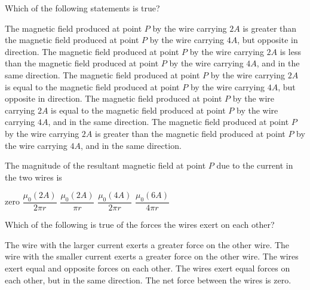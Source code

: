 \documentclass{../../../oss-classkick-exam}
\begin{document}
\begin{multicols*}{2}
\begin{questions}
    \question Which of the following statements is true?
    \begin{choices}
      \choice The magnetic field produced at point $P$ by the wire carrying
      $2A$ is greater than the magnetic field produced at point $P$ by the wire
      carrying $4A$, but opposite in direction.
      \choice The magnetic field produced at point $P$ by the wire carrying
      $2A$ is less than the magnetic field produced at point $P$ by the wire
      carrying $4A$, and in the same direction.
      \choice The magnetic field produced at point $P$ by the wire carrying
      $2A$ is equal to the magnetic field produced at point $P$ by the wire
      carrying $4A$, but opposite in direction.
      \choice The magnetic field produced at point $P$ by the wire carrying
      $2A$ is equal to the magnetic field produced at point $P$ by the wire
      carrying $4A$, and in the same direction.
      \choice The magnetic field produced at point $P$ by the wire carrying
      $2A$ is greater than the magnetic field produced at point $P$ by the wire
      carrying $4A$, and in the same direction.
    \end{choices}
    \label{q:2wires1}
    \vspace{.7in}
    
    \question The magnitude of the resultant magnetic field at point $P$ due to
    the current in the two wires is
    \begin{choices}
      \choice zero
      \choice $\dfrac{\mu_0(2A)}{2\pi r}$
      \choice $\dfrac{\mu_0(2A)}{\pi r}$
      \choice $\dfrac{\mu_0(4A)}{2\pi r}$
      \choice $\dfrac{\mu_0(6A)}{4\pi r}$
    \end{choices}
    \label{q:2wires2}
    \vspace{.7in}
    \columnbreak


    \question Which of the following is true of the forces the wires exert on
    each other?
    \begin{choices}
      \choice The wire with the larger current exerts a greater force on the
      other wire.
      \choice The wire with the smaller current exerts a greater force on the
      other wire.
      \choice The wires exert equal and opposite forces on each other.
      \choice The wires exert equal forces on each other, but in the same
      direction.
      \choice The net force between the wires is zero.
    \end{choices}
    \label{q:2curr1}
    \vspace{.7in}
    

\end{questions}
\end{multicols*}
\end{document}
